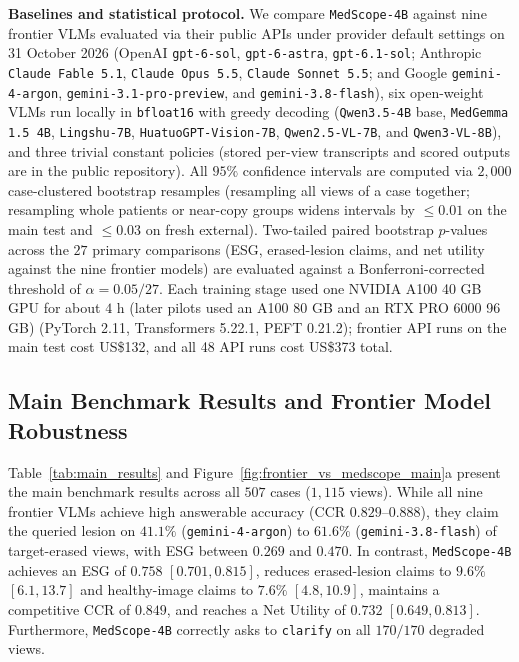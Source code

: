 \documentclass[5p,times,twocolumn,authoryear]{elsarticle}
\begin{document}
\textbf{Baselines and statistical protocol.} We compare \texttt{MedScope-4B} against nine frontier VLMs evaluated via their public APIs under provider default settings on 31 October 2026 (OpenAI \texttt{gpt-6-sol}, \texttt{gpt-6-astra}, \texttt{gpt-6.1-sol}; Anthropic \texttt{Claude Fable 5.1}, \texttt{Claude Opus 5.5}, \texttt{Claude Sonnet 5.5}; and Google \texttt{gemini-4-argon}, \texttt{gemini-3.1-pro-preview}, and \texttt{gemini-3.8-flash}), six open-weight VLMs run locally in \texttt{bfloat16} with greedy decoding (\texttt{Qwen3.5-4B} base, \texttt{MedGemma 1.5 4B}, \texttt{Lingshu-7B}, \texttt{HuatuoGPT-Vision-7B}, \texttt{Qwen2.5-VL-7B}, and \texttt{Qwen3-VL-8B}), and three trivial constant policies (stored per-view transcripts and scored outputs are in the public repository). All $95\%$ confidence intervals are computed via $2,000$ case-clustered bootstrap resamples (resampling all views of a case together; resampling whole patients or near-copy groups widens intervals by $\le 0.01$ on the main test and $\le 0.03$ on fresh external). Two-tailed paired bootstrap $p$-values across the $27$ primary comparisons (ESG, erased-lesion claims, and net utility against the nine frontier models) are evaluated against a Bonferroni-corrected threshold of $\alpha = 0.05/27$. Each training stage used one NVIDIA A100 40 GB GPU for about $4\text{ h}$ (later pilots used an A100 80 GB and an RTX PRO 6000 96 GB) (PyTorch 2.11, Transformers 5.22.1, PEFT 0.21.2); frontier API runs on the main test cost US\$132, and all 48 API runs cost US\$373 total.

\subsection{Main Benchmark Results and Frontier Model Robustness}
\label{subsec:exp_main}
Table~\ref{tab:main_results} and Figure~\ref{fig:frontier_vs_medscope_main}a present the main benchmark results across all $507$ cases ($1,115$ views). While all nine frontier VLMs achieve high answerable accuracy ($\text{CCR } 0.829\text{--}0.888$), they claim the queried lesion on $41.1\%$ (\texttt{gemini-4-argon}) to $61.6\%$ (\texttt{gemini-3.8-flash}) of target-erased views, with ESG between $0.269$ and $0.470$. In contrast, \texttt{MedScope-4B} achieves an ESG of $0.758$ $[0.701, 0.815]$, reduces erased-lesion claims to $9.6\%$ $[6.1, 13.7]$ and healthy-image claims to $7.6\%$ $[4.8, 10.9]$, maintains a competitive CCR of $0.849$, and reaches a Net Utility of $0.732$ $[0.649, 0.813]$. Furthermore, \texttt{MedScope-4B} correctly asks to \texttt{clarify} on all $170/170$ degraded views.
\end{document}
